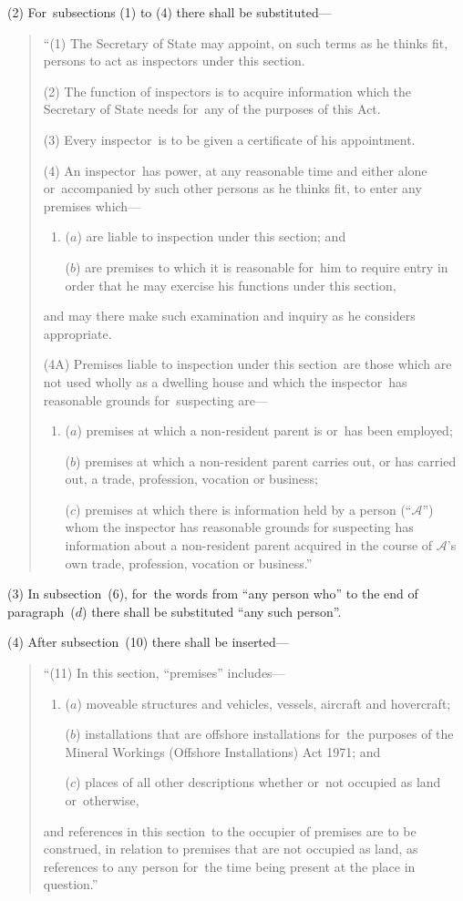 \documentclass[12pt,a4paper]{article}
\begin{document}
(2) For~subsections (1)  to (4) there shall be substituted—
\begin{quotation}
“(1) The Secretary of State may appoint, on such terms as he thinks fit, persons to act as inspectors under this section.

(2) The function of inspectors is to acquire information which the Secretary of State needs for~any of the purposes of this Act.

(3) Every inspector~is to be given a certificate of his appointment.

(4) An inspector~has power, at any reasonable time and either alone or~accompanied by such other persons as he thinks fit, to enter any premises which—
\begin{enumerate}\item[]
($a$) are liable to inspection under this section; and

($b$) are premises to which it is reasonable for~him to require entry in order that he may exercise his functions under this section,
\end{enumerate}
and may there make such examination and inquiry as he considers appropriate.

(4A) Premises liable to inspection under this section~are those which are not used wholly as a dwelling house and which the inspector~has reasonable grounds for~suspecting are—
\begin{enumerate}\item[]
($a$) premises at which a non-resident parent is or~has been employed;

($b$) premises at which a non-resident parent carries out, or has carried out, a trade, profession, vocation or business;

($c$) premises at which there is information held by a person (“$\mathcal{A}$”) whom the inspector has reasonable grounds for suspecting has information about a non-resident parent acquired in the course of $\mathcal{A}$’s own trade, profession, vocation or business.”
\end{enumerate}
\end{quotation}

(3) In subsection~(6), for~the words from “any person who” to the end of paragraph~($d$)  there shall be substituted “any such person”.

(4) After subsection~(10)  there shall be inserted—
\begin{quotation}
“(11) In this section, “premises” includes—
\begin{enumerate}\item[]
($a$) moveable structures and vehicles, vessels, aircraft and hovercraft;

($b$) installations that are offshore installations for~the purposes of the Mineral Workings (Offshore Installations) Act 1971; and

($c$) places of all other descriptions whether or~not occupied as land or~otherwise,
\end{enumerate}
and references in this section~to the occupier of premises are to be construed, in relation to premises that are not occupied as land, as references to any person for~the time being present at the place in question.”
\end{quotation}
\end{document}
